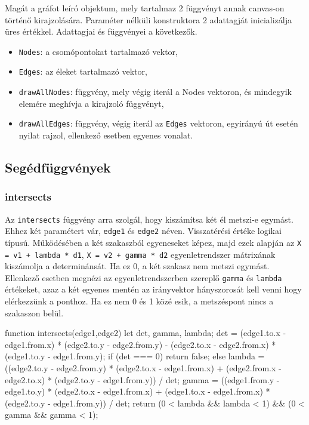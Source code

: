 Magát a gráfot leíró objektum, mely tartalmaz 2 függvényt annak canvas-on történő kirajzolására. Paraméter nélküli konstruktora 2 adattagját inicializálja üres értékkel. Adattagjai és függvényei a következők.
\begin{itemize}
\item \texttt{Nodes}: a csomópontokat tartalmazó vektor,
\item \texttt{Edges}: az éleket tartalmazó vektor,
\item \texttt{drawAllNodes}: függvény, mely végig iterál a Nodes vektoron, és mindegyik elemére meghívja a kirajzoló függvényt,
\item \texttt{drawAllEdges}: függvény, végig iterál az \texttt{Edges} vektoron, egyirányú út esetén nyilat rajzol, ellenkező esetben egyenes vonalat.
\end{itemize}

\subsection{Segédfüggvények}

\subsubsection{intersects}

Az \texttt{intersects} függvény arra szolgál, hogy kiszámítsa két él metszi-e egymást. Ehhez két paramétert vár, \texttt{edge1} és \texttt{edge2} néven. Visszatérési értéke logikai típusú.
Működésében a két szakaszból egyeneseket képez, majd ezek alapján az \texttt{X = v1 + lambda * d1}, \texttt{X = v2 + gamma * d2} egyenletrendszer mátrixának kiszámolja a determinánsát. Ha ez 0, a két szakasz nem metszi egymást.
Ellenkező esetben megnézi az egyenletrendszerben szereplő \texttt{gamma} és \texttt{lambda} értékeket, azaz a két egyenes mentén az irányvektor hányszorosát kell venni hogy elérkezzünk a ponthoz. Ha ez nem 0 és 1 közé esik, a metszéspont nincs a szakaszon belül.
\begin{cpp}
function intersects(edge1,edge2) {
    let det, gamma, lambda;
    det = (edge1.to.x - edge1.from.x) * (edge2.to.y - edge2.from.y) - 
    (edge2.to.x - edge2.from.x) * (edge1.to.y - edge1.from.y);
    if (det === 0) {
        return false;
    } else {
        lambda = ((edge2.to.y - edge2.from.y) * (edge2.to.x - edge1.from.x)
         + (edge2.from.x - edge2.to.x) * (edge2.to.y - edge1.from.y)) / det;
        gamma = ((edge1.from.y - edge1.to.y) * (edge2.to.x - edge1.from.x)
         + (edge1.to.x - edge1.from.x) * (edge2.to.y - edge1.from.y)) / det;
        return (0 < lambda && lambda < 1) && (0 < gamma && gamma < 1);
    }
}
\end{cpp}

